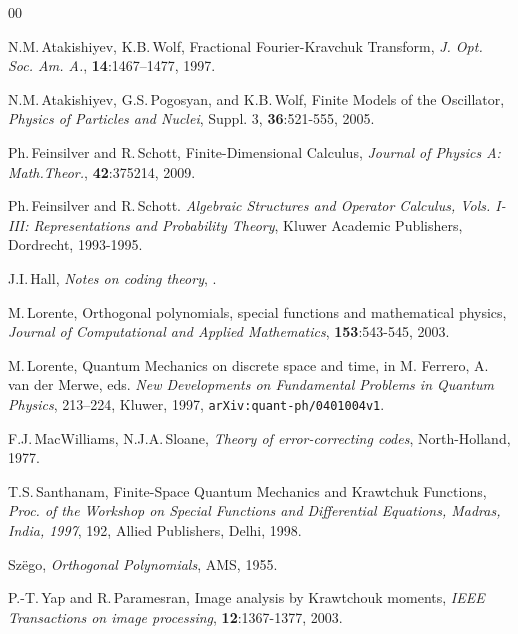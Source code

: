 \documentclass[runningheads]{llncs}
\begin{document}
\begin{thebibliography}{00}

N.M.\,Atakishiyev, K.B.\,Wolf, 
{Fractional Fourier-Kravchuk Transform},
\emph{  J. Opt. Soc. Am. A.}, {\bf 14}:1467--1477, 1997.

N.M.\,Atakishiyev, G.S.\,Pogosyan, and K.B.\,Wolf, 
{        Finite Models of the Oscillator},
\emph{Physics of Particles and Nuclei}, Suppl. 3, {\bf 36}:521-555, 2005.

 Ph.\,Feinsilver and R.\,Schott, Finite-Dimensional Calculus,
\emph{Journal of Physics A: Math.Theor.}, {\bf 42}:375214, 2009.


Ph.\,Feinsilver and R.\,Schott.
\emph{Algebraic Structures and Operator Calculus, Vols. I-III:
  Representations and Probability Theory},
Kluwer Academic Publishers, Dordrecht, 1993-1995.

 J.I.\,Hall, \emph{Notes on coding theory}, \hfill{}.

M.\,Lorente,
{Orthogonal polynomials, special functions and mathematical physics},
\emph{Journal of Computational and Applied Mathematics}, {\bf 153}:543-545, 2003.

M.\,Lorente, {Quantum Mechanics on discrete space and time},
in M. Ferrero, A. van der Merwe, eds. 
\emph{New Developments on Fundamental Problems in Quantum Physics},  213--224, Kluwer, 1997,
{\tt arXiv:quant-ph/0401004v1}.

 F.J.\,MacWilliams, N.J.A.\,Sloane,  \emph{Theory of error-correcting codes},
North-Holland, 1977.


T.S.\,Santhanam, {Finite-Space Quantum Mechanics and Krawtchuk Functions},
\emph{Proc. of the Workshop on Special Functions and Differential Equations,
Madras, India, 1997}, 192, Allied Publishers, Delhi, 1998.

Sz\"ego, \emph{Orthogonal Polynomials}, AMS, 1955.

P.-T.\,Yap and R.\,Paramesran, {Image analysis by Krawtchouk moments},
\emph{IEEE Transactions on image processing}, {\bf 12}:1367-1377, 2003.

\end{thebibliography}
\end{document}
